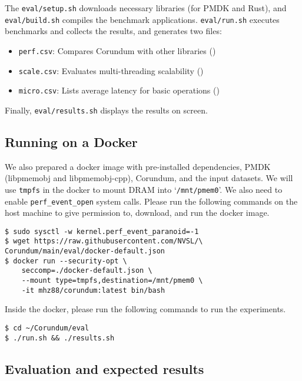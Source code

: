 {The \verb+eval/setup.sh+ downloads necessary libraries (for PMDK and Rust), and \verb+eval/build.sh+ compiles the benchmark applications.
\verb+eval/run.sh+ executes benchmarks and collects the results, and generates two files:

\begin{itemize}
  \item \verb+perf.csv+: Compares Corundum with other libraries ()
  \item \verb+scale.csv+: Evaluates multi-threading scalability ()
  \item \verb+micro.csv+: Lists average latency for basic operations ()
\end{itemize}

\noindent Finally, \verb+eval/results.sh+ displays the results on screen.


\subsection{Running on a Docker}

We also prepared a docker image with pre-installed dependencies, PMDK (libpmemobj and libpmemobj-cpp), Corundum, and the input datasets. We will use \verb+tmpfs+ in the docker to mount DRAM into `\verb+/mnt/pmem0+'. We also need to enable \verb+perf_event_open+ system calls. Please run the following commands on the host machine to give permission to, download, and run the docker image.


\begin{verbatim}
$ sudo sysctl -w kernel.perf_event_paranoid=-1
$ wget https://raw.githubusercontent.com/NVSL/\
Corundum/main/eval/docker-default.json
$ docker run --security-opt \
    seccomp=./docker-default.json \
    --mount type=tmpfs,destination=/mnt/pmem0 \
    -it mhz88/corundum:latest bin/bash
\end{verbatim}

\noindent
Inside the docker, please run the following commands to run the experiments.

\begin{verbatim}
$ cd ~/Corundum/eval
$ ./run.sh && ./results.sh
\end{verbatim}

\subsection{Evaluation and expected results}

}
